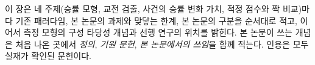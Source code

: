 이 장은 네 주제(승률 모형, 교전 검출, 사건의 승률 변화 가치, 적정 점수와 짝 비교)마다 기존 패러다임, 본 논문의 과제와 맞닿는 한계, 본 논문의 구분을 순서대로 적고, 이어서 측정 모형의 구성 타당성 개념과 선행 연구의 위치를 밝힌다. 본 논문이 쓰는 개념은 처음 나온 곳에서 \emph{정의}, \emph{기원 문헌}, \emph{본 논문에서의 쓰임}을 함께 적는다. 인용은 모두 실재가 확인된 문헌이다.
